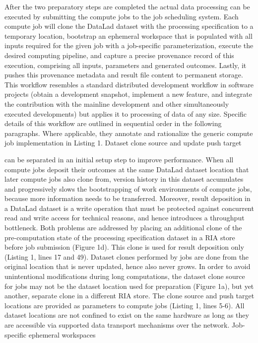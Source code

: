 After the two preparatory steps are completed the actual data processing can be executed by submitting the compute jobs to the job scheduling system. Each compute job will clone the DataLad dataset with the processing specification to a temporary location, bootstrap an ephemeral workspace that is populated with all inputs required for the given job with a job-specific parameterization, execute the desired computing pipeline, and capture a precise provenance record of this execution, comprising all inputs, parameters and generated outcomes. Lastly, it pushes this provenance metadata and result file content to permanent storage. This workflow resembles a standard distributed development workflow in software projects (obtain a development snapshot, implement a new feature, and integrate the contribution with the mainline development and other simultaneously executed developments) but applies it to processing of data of any size. Specific details of this workflow are outlined in sequential order in the following paragraphs. Where applicable, they annotate and rationalize the generic compute job implementation in Listing 1.
Dataset clone source and update push target

can be separated in an initial setup step to improve performance. When all compute jobs deposit their outcomes at the same DataLad dataset location that later compute jobs also clone from, version history in this dataset accumulates and progressively slows the bootstrapping of work environments of compute jobs, because more information needs to be transferred. Moreover, result deposition in a DataLad dataset is a write operation that must be protected against concurrent read and write access for technical reasons, and hence introduces a throughput bottleneck. Both problems are addressed by placing an additional clone of the pre-computation state of the processing specification dataset in a RIA store before job submission (Figure 1d). This clone is used for result deposition only (Listing 1, lines 17 and 49). Dataset clones performed by jobs are done from the original location that is never updated, hence also never grows. In order to avoid unintentional modifications during long computations, the dataset clone source for jobs may not be the dataset location used for preparation (Figure 1a), but yet another, separate clone in a different RIA store. The clone source and push target locations are provided as parameters to compute jobs (Listing 1, lines 5-6). All dataset locations are not confined to exist on the same hardware as long as they are accessible via supported data transport mechanisms over the network.
Job-specific ephemeral workspaces

